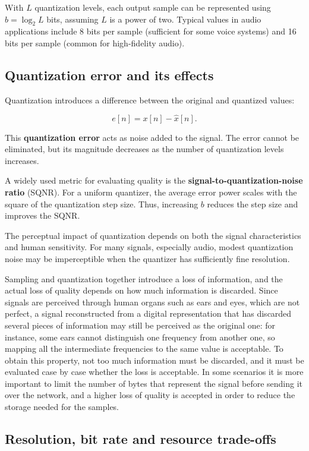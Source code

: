 With $L$ quantization levels, each output sample can be represented using $b = \log_2 L$ bits, assuming $L$ is a power of two. Typical values in audio applications include 8 bits per sample (sufficient for some voice systems) and 16 bits per sample (common for high-fidelity audio).

\subsection{Quantization error and its effects}

Quantization introduces a difference between the original and quantized values:

\[ e[n] = x[n] - \hat{x}[n]. \]

This \textbf{quantization error} acts as noise added to the signal. The error cannot be eliminated, but its magnitude decreases as the number of quantization levels increases.

A widely used metric for evaluating quality is the \textbf{signal-to-quantization-noise ratio} (SQNR). For a uniform quantizer, the average error power scales with the square of the quantization step size. Thus, increasing $b$ reduces the step size and improves the SQNR.

The perceptual impact of quantization depends on both the signal characteristics and human sensitivity. For many signals, especially audio, modest quantization noise may be imperceptible when the quantizer has sufficiently fine resolution.

Sampling and quantization together introduce a loss of information, and the actual loss of quality depends on how much information is discarded. Since signals are perceived through human organs such as ears and eyes, which are not perfect, a signal reconstructed from a digital representation that has discarded several pieces of information may still be perceived as the original one: for instance, some ears cannot distinguish one frequency from another one, so mapping all the intermediate frequencies to the same value is acceptable. To obtain this property, not too much information must be discarded, and it must be evaluated case by case whether the loss is acceptable. In some scenarios it is more important to limit the number of bytes that represent the signal before sending it over the network, and a higher loss of quality is accepted in order to reduce the storage needed for the samples.
\subsection{Resolution, bit rate and resource trade-offs}


